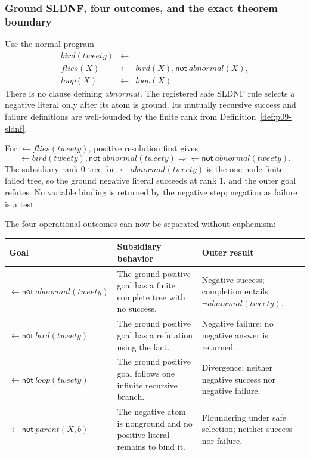 \subsubsection{Ground SLDNF, four outcomes, and the exact theorem boundary}

Use the normal program
\[
\begin{array}{rcl}
 bird(tweety)&\leftarrow&\\
 flies(X)&\leftarrow&bird(X),\mathsf{not}\ abnormal(X),\\
 loop(X)&\leftarrow&loop(X).
\end{array}
\]
There is no clause defining \(abnormal\).  The registered safe SLDNF rule
selects a negative literal only after its atom is ground.  Its mutually
recursive success and failure definitions are well-founded by the finite rank
from Definition~\ref{def:p09-sldnf}.

For \(\leftarrow flies(tweety)\), positive resolution first gives
\[
 \leftarrow bird(tweety),\mathsf{not}\ abnormal(tweety)
 \Longrightarrow
 \leftarrow\mathsf{not}\ abnormal(tweety).
\]
The subsidiary rank-\(0\) tree for
\(\leftarrow abnormal(tweety)\) is the one-node finite failed tree, so the
ground negative literal succeeds at rank \(1\), and the outer goal refutes.  No
variable binding is returned by the negative step; negation as failure is a
test.

The four operational outcomes can now be separated without euphemism:
\begin{center}
\begin{tabularx}{\textwidth}{@{}l X X@{}}
\toprule
Goal & Subsidiary behavior & Outer result \\
\midrule
\(\leftarrow\mathsf{not}\ abnormal(tweety)\)
  & The ground positive goal has a finite complete tree with no success.
  & Negative success; completion entails
    \(\neg abnormal(tweety)\). \\
\(\leftarrow\mathsf{not}\ bird(tweety)\)
  & The ground positive goal has a refutation using the fact.
  & Negative failure; no negative answer is returned. \\
\(\leftarrow\mathsf{not}\ loop(tweety)\)
  & The ground positive goal follows one infinite recursive branch.
  & Divergence; neither negative success nor negative failure. \\
\(\leftarrow\mathsf{not}\ parent(X,b)\)
  & The negative atom is nonground and no positive literal remains to bind it.
  & Floundering under safe selection; neither success nor failure. \\
\bottomrule
\end{tabularx}
\end{center}

